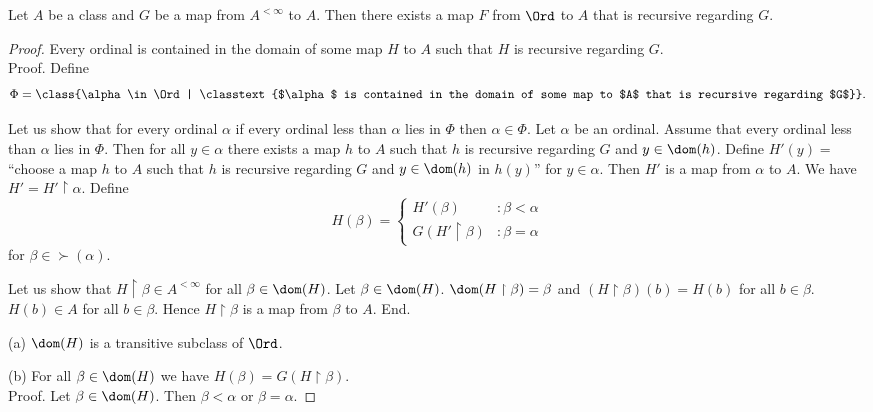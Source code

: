 \documentclass{article}
\begin{document}
  \begin{forthel}
    \begin{theorem*}[title=Transfinite Recursion Theorem: Existence,id=recursion_existence]
      Let $A$ be a class and $G$ be a map from $A^{< \infty}$ to $A$.
      Then there exists a map $F$ from $\Ord$ to $A$ that is recursive regarding $G$.
    \end{theorem*}
    \begin{proof}
      Every ordinal is contained in the domain of some map $H$ to $A$ such that $H$ is recursive regarding $G$. \\
      Proof.
        Define \[ \Phi = \class{\alpha \in \Ord | \classtext{$\alpha$ is contained in the domain of some map to $A$ that is recursive regarding $G$}}. \]

        Let us show that for every ordinal $\alpha$ if every ordinal less than $\alpha$ lies in $\Phi$ then $\alpha \in \Phi$.
          Let $\alpha$ be an ordinal.
          Assume that every ordinal less than $\alpha$ lies in $\Phi$.
          Then for all $y \in \alpha$ there exists a map $h$ to $A$ such that $h$ is recursive regarding $G$ and $y \in \dom(h)$.
          Define $H'(y) =$ ``choose a map $h$ to $A$ such that $h$ is recursive regarding $G$ and $y \in \dom(h)$ in $h(y)$'' for $y \in \alpha$.
          Then $H'$ is a map from $\alpha$ to $A$.
          We have $H' = H' \restriction \alpha$.
          Define \[ H(\beta) =
            \begin{cases}
              H'(\beta)                 & : \beta < \alpha \\
              G(H' \restriction \beta)  & : \beta = \alpha
            \end{cases} \]
          for $\beta \in \succ(\alpha)$.
          
          Let us show that $H \restriction \beta \in A^{< \infty}$ for all $\beta \in \dom(H)$.
            Let $\beta \in \dom(H)$.
            $\dom(H \restriction \beta) = \beta$ and $(H \restriction \beta)(b) = H(b)$ for all $b \in \beta$.
            $H(b) \in A$ for all $b \in \beta$.
            Hence $H \restriction \beta$ is a map from $\beta$ to $A$.
          End.

          (a) $\dom(H)$ is a transitive subclass of $\Ord$.

          (b) For all $\beta \in \dom(H)$ we have $H(\beta) = G(H \restriction \beta)$. \\
          Proof.
            Let $\beta \in \dom(H)$.
            Then $\beta < \alpha$ or $\beta = \alpha$.


\end{proof}
\end{forthel}
\end{document}

